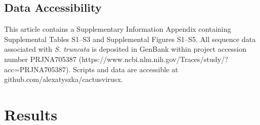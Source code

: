 \documentclass[fleqn,10pt,lineno]{wlpeerj}
\begin{document}
\subsection*{Data Accessibility}

This article contains a Supplementary Information Appendix containing Supplemental Tables S1--S3 and Supplemental Figures S1--S5. 
All sequence data associated with \textit{S. truncata} is deposited in GenBank within project accession number PRJNA705387 (https://www.ncbi.nlm.nih.gov/Traces/study/?acc=PRJNA705387). Scripts and data are accessible at github.com/alexatyszka/cactusvirusx.


\section*{Results}
\end{document}
